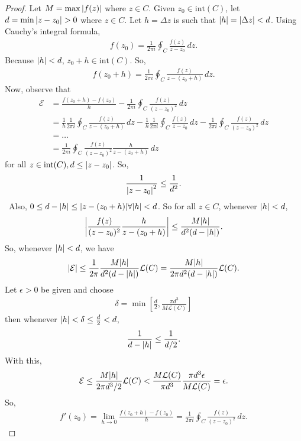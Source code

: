 \documentclass{article}
\theoremstyle{definition}
\newcommand{\f}[2]{\frac{#1}{#2}}
\newcommand{\lag}{\mathcal{L}}
\newcommand{\lb}{\left[}
\newcommand{\rb}{\right]}
\newcommand{\nn}{\nonumber}
\begin{document}
\begin{proof}
	Let $M = \max\abs{f(z)}$ where $z\in C$. Given $z_0 \in \text{int}(C)$, let $d = \min\abs{z - z_0} > 0$ where $z\in C$. Let $h = \Delta z$ is such that $\abs{h} = \abs{\Delta z} < d$. Using Cauchy's integral formula,
	\begin{align}
	f(z_0) = \f{1}{2\pi i}\oint_C \f{f(z)}{z-z_0}\,dz.
	\end{align}
	Because $\abs{h} < d$, $z_0 + h \in \text{int}(C)$. So,
	\begin{align}
	f(z_0 + h) = \f{1}{2\pi i}\oint_C \f{f(z)}{z - (z_0 + h)}\,dz.
	\end{align}
	Now, observe that
	\begin{align}
	\mathcal{E} &= \f{f(z_0 + h ) - f(z_0)}{h} - \f{1}{2\pi i}\oint_C \f{f(z)}{(z - z_0)^2}\,dz\nn\\
	&= \f{1}{h}\f{1}{2\pi i}\oint_C \f{f(z)}{z - (z_0 + h)}\,dz - \f{1}{h} \f{1}{2\pi i}\oint_C \f{f(z)}{z-z_0}\,dz- \f{1}{2\pi i}\oint_C \f{f(z)}{(z - z_0)^2}\,dz\nn\\
	&= \dots\nn\\
	&= \f{1}{2\pi i}\oint_C \f{f(z)}{(z - z_0)^2}\f{h}{z - (z_0 + h)}\,dz
	\end{align}
	for all $z \in \text{int}(C), d \leq \abs{z-z_0}$. So, 
	\begin{align}
	\f{1}{\abs{z - z_0}^2} \leq \f{1}{d^2}.
	\end{align}\
	Also, $0 \leq d - \abs{h} \leq \abs{z - (z_0 + h)}\forall \abs{h} < d$. So for all $z\in C$, whenever $\abs{h} < d$,
	\begin{align}
	\abs{\f{f(z)}{(z - z_0)^2}\f{h}{z - (z_0 + h)}} \leq \f{M\abs{h}}{d^2 (d - \abs{h})}.
	\end{align} 
	So, whenever $\abs{h} < d$, we have
	\begin{align}
	\abs{\mathcal{E}} \leq \f{1}{2\pi}\f{M\abs{h}}{d^2 (d - \abs{h})}\lag(C) = \f{M\abs{h}}{2\pi d^2 (d - \abs{h})}\lag(C).
	\end{align}
	Let $\epsilon > 0$ be given and choose 
	\begin{align}
	\delta = \min\lb \f{d}{2}, \f{\pi d^3}{M\lag(C)} \rb 
	\end{align}
	then whenever $\abs{h} < \delta \leq \f{d}{2} < d$,
	\begin{align}
	\f{1}{d - \abs{h}} \leq \f{1}{d/2}.
	\end{align} 
	With this,
	\begin{align}
	\mathcal{E} \leq \f{M\abs{h}}{2\pi d^3/2}\lag(C) < \f{M\lag(C)}{\pi d^3} \f{\pi d^3 \epsilon}{M\lag(C)} = \epsilon.
	\end{align}
	So,
	\begin{align}
	f'(z_0) =\lim_{h\to 0}\f{f(z_0 + h) - f(z_0)}{h} = \f{1}{2\pi i}\oint_C \f{f(z)}{(z - z_0)^2}\,dz.
	\end{align}
\end{proof}
\end{document}
